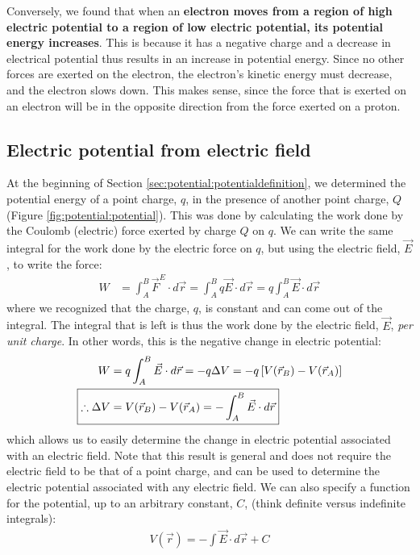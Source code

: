 \begin{example}
Conversely, we found that when an \textbf{electron moves from a region of high electric potential to a region of low electric potential, its potential energy increases}. This is because it has a negative charge and a decrease in electrical potential thus results in an increase in potential energy. Since no other forces are exerted on the electron, the electron's kinetic energy must decrease, and the electron slows down. This makes sense, since the force that is exerted on an electron will be in the opposite direction from the force exerted on a proton. 
\end{example}

\subsection{Electric potential from electric field}
At the beginning of Section \ref{sec:potential:potentialdefinition}, we determined the potential energy of a point charge, $q$, in the presence of another point charge, $Q$ (Figure \ref{fig:potential:potential}). This was done by calculating the work done by the Coulomb (electric) force exerted by charge $Q$ on $q$. We can write the same integral for the work done by the electric force on $q$, but using the electric field, $\vec E$, to write the force:
\begin{align*}
W&=\int_A^B \vec F^E\cdot d\vec r=\int_A^B q \vec E\cdot d\vec r=q \int_A^B  \vec E\cdot d\vec r
\end{align*}
where we recognized that the charge, $q$, is constant and can come out of the integral. The integral that is left is thus the work done by the electric field, $\vec E$, \textit{per unit charge}. In other words, this is the negative change in electric potential:
\begin{align*}
W&=q \int_A^B  \vec E\cdot d\vec r=-q\Delta V = -q\left[ V(\vec r_B)-V(\vec r_A) \right]\\
\Aboxed{\therefore \Delta V &=V(\vec r_B)-V(\vec r_A)=-\int_A^B  \vec E\cdot d\vec r}
\end{align*}
which allows us to easily determine the change in electric potential associated with an electric field. Note that this result is general and does not require the electric field to be that of a point charge, and can be used to determine the electric potential associated with any electric field. We can also specify a function for the potential, up to an arbitrary constant, $C$, (think definite versus indefinite integrals):
\begin{align*}
V(\vec r)=-\int \vec E\cdot d\vec r + C
\end{align*}
